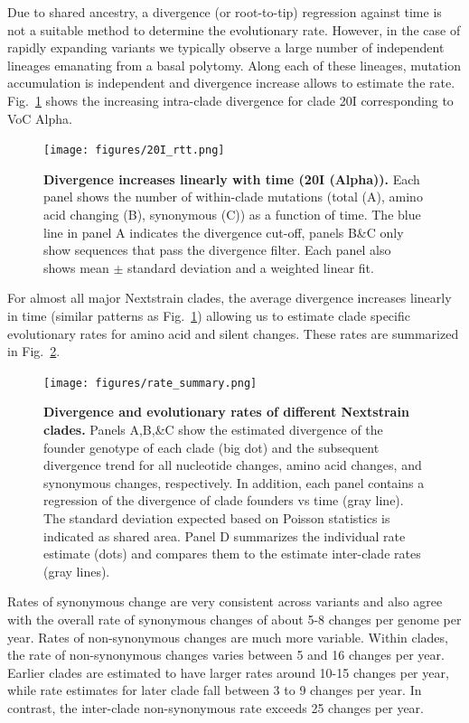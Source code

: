 \documentclass[aps,rmp, twocolumn]{revtex4}
\begin{document}
Due to shared ancestry, a divergence (or root-to-tip) regression against time is not a suitable method to determine the evolutionary rate.
However, in the case of rapidly expanding variants we typically observe a large number of independent lineages emanating from a basal polytomy.
Along each of these lineages, mutation accumulation is independent and divergence increase allows to estimate the rate.
Fig.~\ref{fig:rate_alpha} shows the increasing intra-clade divergence for clade 20I corresponding to VoC Alpha.

\begin{figure}[tb]
    \texttt{[image: figures/20I\_rtt.png]}
    \caption{{\bf Divergence increases linearly with time (20I (Alpha)).} Each panel shows the number of within-clade mutations (total (A), amino acid changing (B), synonymous (C)) as a function of time.
    The blue line in panel A indicates the divergence cut-off, panels B\&C only show sequences that pass the divergence filter. Each panel also shows mean $\pm$ standard deviation and a weighted linear fit.
    \label{fig:rate_alpha}}
\end{figure}

For almost all major Nextstrain clades, the average divergence increases linearly in time (similar patterns as Fig.~\ref{fig:rate_alpha}) allowing us to estimate clade specific evolutionary rates for amino acid and silent changes.
These rates are summarized in Fig.~\ref{fig:rate_summary}.

\begin{figure}
    \texttt{[image: figures/rate\_summary.png]}
    \caption[]{{\bf Divergence and evolutionary rates of different Nextstrain clades.} Panels A,B,\&C show the estimated divergence of the founder genotype of each clade (big dot) and the subsequent divergence trend for all nucleotide changes, amino acid changes, and synonymous changes, respectively. In addition, each panel contains a regression of the divergence of clade founders vs time (gray line).
    The standard deviation expected based on Poisson statistics is indicated as shared area.
    Panel D summarizes the individual rate estimate (dots) and compares them to the estimate inter-clade rates (gray lines).
    \label{fig:rate_summary} }
\end{figure}

Rates of synonymous change are very consistent across variants and also agree with the overall rate of synonymous changes of about 5-8 changes per genome per year.
Rates of non-synonymous changes are much more variable.
Within clades, the rate of non-synonymous changes varies between 5 and 16 changes per year.
Earlier clades are estimated to have larger rates around 10-15 changes per year, while rate estimates for later clade fall  between 3 to 9 changes per year.
In contrast, the inter-clade non-synonymous rate exceeds 25 changes per year.
\end{document}
